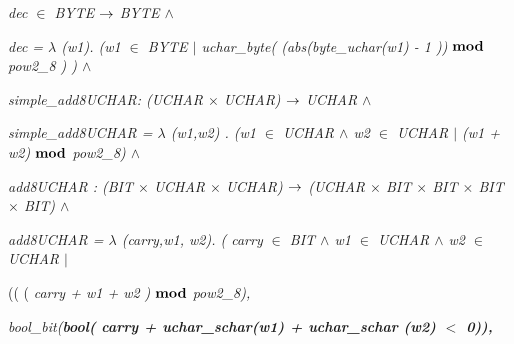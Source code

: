 \documentclass[11pt]{article}
\begin{document}
\begin{sloppypar}
\hspace*{0.20in}\it dec  $\in$ \hspace*{0.10in}\it BYTE\hspace*{0.10in} $\fun$  \it BYTE  $\land$ 

\hspace*{0.20in}\it dec \rm =  $\lambda$  \rm (\it w1\rm )\rm . \rm (\it w1  $\in$  \it BYTE  $\mid$  \it uchar\_byte\rm ( \rm (\it abs\rm (\it byte\_uchar\rm (\it w1\rm ) \rm - \rm 1 \rm )\rm )  $\mod$  \it pow2\_8 \rm ) \rm )  $\land$ 

\hspace*{0.20in}

\hspace*{0.20in}\it simple\_add8UCHAR\hspace*{0.10in}\rm : \rm (\it UCHAR  $\times$  \it UCHAR\rm )  $\fun$  \it UCHAR  $\land$ 

\hspace*{0.20in}\it simple\_add8UCHAR \rm =  $\lambda$  \rm (\it w1\rm ,\it w2\rm ) \rm . \rm (\it w1  $\in$  \it UCHAR  $\land$  \it w2  $\in$  \it UCHAR  $\mid$  \rm (\it w1 \rm + \it w2\rm )  $\mod$  \it pow2\_8\rm )  $\land$ \hspace*{0.20in}

\hspace*{0.20in}

\hspace*{0.20in}

\hspace*{0.20in} 

\hspace*{0.20in}\it add8UCHAR \rm : \rm (\it BIT  $\times$  \it UCHAR  $\times$  \it UCHAR\rm )  $\fun$  \rm (\it UCHAR  $\times$  \it BIT  $\times$  \it BIT  $\times$  \it BIT  $\times$  \it BIT\rm )  $\land$ 

\hspace*{0.20in}\it add8UCHAR \rm =  $\lambda$  \rm (\it carry\rm ,\it w1\rm , \it w2\rm )\rm . \rm ( \it carry  $\in$  \it BIT  $\land$  \it w1  $\in$  \it UCHAR  $\land$  \it w2  $\in$  \it UCHAR\hspace*{0.20in} $\mid$ 

\hspace*{0.40in}\rm (\rm ( \rm ( \it carry \rm + \it w1 \rm + \it w2 \rm )  $\mod$  \it pow2\_8\rm )\hspace*{0.15in}\rm ,\hspace*{0.10in}

\hspace*{0.60in}\it bool\_bit\rm (\bf bool\rm ( \it carry \rm + \it uchar\_schar\rm (\it w1\rm ) \rm + \it uchar\_schar \rm (\it w2\rm ) $<$ \rm 0\rm )\rm )\hspace*{0.20in}\rm ,


\end{sloppypar}
\end{document}
